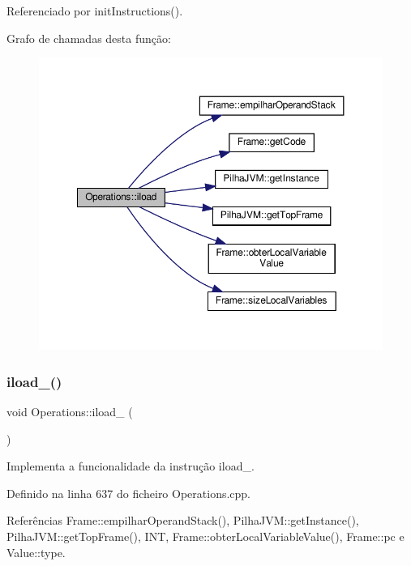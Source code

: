 Referenciado por init\+Instructions().

Grafo de chamadas desta função\+:
\nopagebreak
\begin{figure}[H]
\begin{center}
\leavevmode
\includegraphics[width=350pt]{classOperations_a84e70afc25fa4e54a7e2bffae742222a_cgraph}
\end{center}
\end{figure}
\mbox{\label{classOperations_a3aba059cf78681767c141d27989fc2aa}} 
\subsubsection{\texorpdfstring{iload\+\_()}{iload\_0()}}
{\footnotesize\ttfamily void Operations\+::iload\+\_ (\begin{DoxyParamCaption}{ }\end{DoxyParamCaption})\hspace{0.3cm}{\ttfamily [private]}}



Implementa a funcionalidade da instrução iload\+\_. 



Definido na linha 637 do ficheiro Operations.\+cpp.



Referências Frame\+::empilhar\+Operand\+Stack(), Pilha\+J\+V\+M\+::get\+Instance(), Pilha\+J\+V\+M\+::get\+Top\+Frame(), I\+NT, Frame\+::obter\+Local\+Variable\+Value(), Frame\+::pc e Value\+::type.



